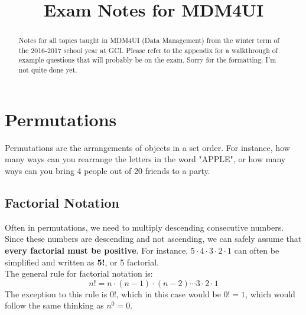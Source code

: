 \documentclass[final,1p,12pt]{elsarticle}
\begin{document}
\begin{frontmatter}
    \title{Exam Notes for MDM4UI}
    \begin{abstract}
        Notes for all topics taught in MDM4UI (Data Management) from the winter term of the 2016-2017 school year at GCI.  Please refer to the appendix for a walkthrough of example questions that will probably be on the exam. Sorry for the formatting. I'm not quite done yet.
    \end{abstract}
\end{frontmatter}

\section{Permutations}
Permutations are the arrangements of objects in a set order. 
For instance, how many ways can you rearrange the letters in the word "APPLE", 
or how many ways can you bring 4 people out of 20 friends to a party.

    \subsection{Factorial Notation}
    Often in permutations, we need to multiply descending consecutive numbers. Since these numbers
    are descending and not ascending, we can safely assume that \textbf{every factorial must be positive}. 
    For instance,  $5\cdot4\cdot3\cdot2\cdot1$ can often be simplified and written as \textbf{5!}, or 5 factorial.\\
    The general rule for factorial notation is: 
    \begin{equation}%
        n! = n\cdot(n-1)\cdot(n-2)\cdots3\cdot2\cdot1
    \end{equation}
    The exception to this rule is 0!, which in this case would be $0! = 1$, which would follow the same thinking as $n^0=0$.%
    
\end{document}
